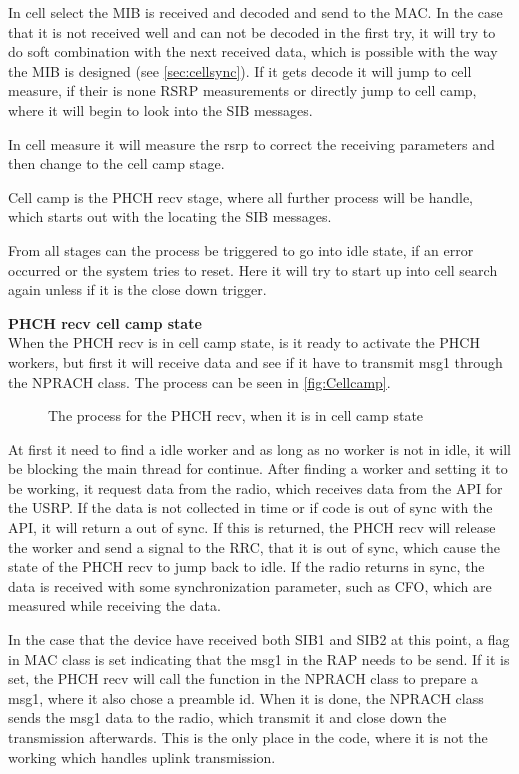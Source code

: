 In cell select the MIB is received and decoded and send to the MAC. In the case that it is not received well and can not be decoded in the first try, it will try to do soft combination with the next received data, which is possible with the way the MIB is designed (see \autoref{sec:cellsync}). If it gets decode it will jump to cell measure, if their is none \gls{RSRP} measurements or directly jump to cell camp, where it will begin to look into the SIB messages.

In cell measure it will measure the rsrp to correct the receiving parameters and then change to the cell camp stage.

Cell camp is the PHCH recv stage, where all further process will be handle, which starts out with the locating the SIB messages.

From all stages can the process be triggered to go into idle state, if an error occurred or the system tries to reset. Here it will try to start up into cell search again unless if it is the close down trigger.

\textbf{PHCH recv cell camp state} \\
When the PHCH recv is in cell camp state, is it ready to activate the PHCH workers, but first it will receive data and see if it have to transmit msg1 through the NPRACH class. The process can be seen in \autoref{fig:Cellcamp}.

\begin{figure}[H]
\centering
{}
\resizebox{0.7\textwidth}{!}{
}
\caption{The process for the PHCH recv, when it is in cell camp state}
\label{fig:Cellcamp}
\end{figure}

At first it need to find a idle worker and as long as no worker is not in idle, it will be blocking the main thread for continue. After finding a worker and setting it to be working, it request data from the radio, which receives data from the API for the USRP. If the data is not collected in time or if code is out of sync with the API, it will return a out of sync. If this is returned, the PHCH recv will release the worker and send a signal to the RRC, that it is out of sync, which cause the state of the PHCH recv to jump back to idle. If the radio returns in sync, the data is received with some synchronization parameter, such as \gls{CFO}, which are measured while receiving the data.

In the case that the device have received both SIB1 and SIB2 at this point, a flag in MAC class is set indicating that the msg1 in the \gls{RAP} needs to be send. If it is set, the PHCH recv will call the function in the NPRACH class to prepare a msg1, where it also chose a preamble id. When it is done, the NPRACH class sends the msg1 data to the radio, which transmit it and close down the transmission afterwards. This is the only place in the code, where it is not the working which handles uplink transmission.

